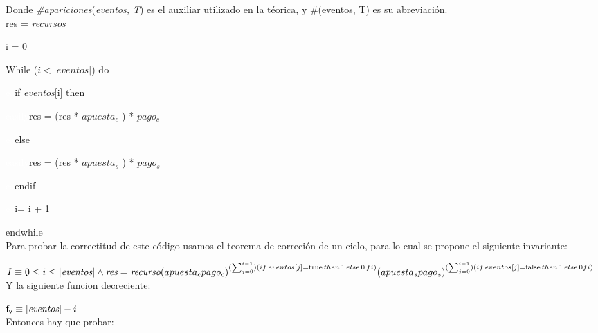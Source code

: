 \documentclass[10pt,a4paper]{article}
\begin{document}
    Donde \textit{\#apariciones}(\textit{eventos, T}) es el auxiliar utilizado en la téorica, y \#(eventos, T) es su abreviación. \\
    
    res = \textit{recursos}

    i = 0
    
    While ($i < \left\lvert {\textit{eventos}}\right\rvert$) do
    
    \textcolor{white}{ea}if \textit{eventos}[i] then
    
    \textcolor{white}{easily}res = (res * $apuesta_{c}$ ) * $pago_{c}$
    
    \textcolor{white}{ea}else

    \textcolor{white}{easily}res = (res * $apuesta_{s}$ ) * $pago_{s}$

    \textcolor{white}{ea}endif

    \textcolor{white}{ea}i= i + 1

    endwhile \\
     
    Para probar la correctitud de este código usamos el teorema de correción de un ciclo, para lo cual se propone el siguiente invariante:

    $I \equiv 0 \leq i \leq |{\textit{eventos}}\vert \land \\
     \textit{res} = \textit{recurso}(\textit{$apuesta_{c}$}\textit{$pago_{c}$})^{(\sum_{j = 0}^{i -1})(if \hspace{0.5mm} eventos[j] = \mathrm{true} \hspace{0.5mm} then \hspace{0.5mm} 1 \hspace{0.5mm} else \hspace{0.5mm} 0 \hspace{0.5mm} fi)}
     (\textit{$apuesta_{s}$}\textit{$pago_{s}$})^{(\sum_{j = 0}^{i -1})(if \hspace{0.5mm} eventos[j] = \mathrm{false} \hspace{0.5mm} then  \hspace{0.5mm} 1  \hspace{0.5mm} else \hspace{0.5mm} 0 fi)}$\\
     
    Y la siguiente funcion decreciente:
    
    $\mathsf{f_{v}} \equiv |\textit{eventos}\vert - i$ \\
    
    Entonces hay que probar:
\end{document}
